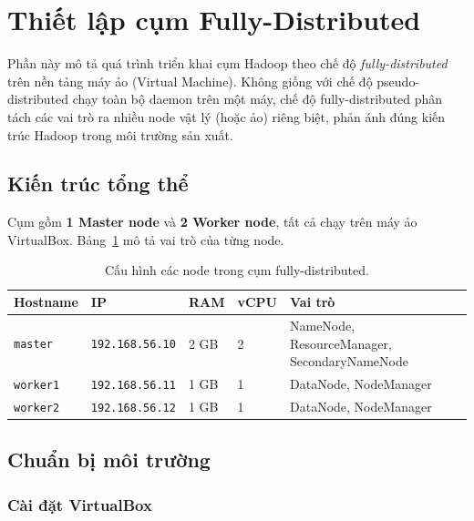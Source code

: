\section{Thiết lập cụm Fully-Distributed}
\label{sec:fully-distributed}


Phần này mô tả quá trình triển khai cụm Hadoop theo chế độ \textit{fully-distributed} trên nền tảng máy ảo (Virtual Machine). Không giống với chế độ pseudo-distributed chạy toàn bộ daemon trên một máy, chế độ fully-distributed phân tách các vai trò ra nhiều node vật lý (hoặc ảo) riêng biệt, phản ánh đúng kiến trúc Hadoop trong môi trường sản xuất.

\subsection{Kiến trúc tổng thể}

Cụm gồm \textbf{1 Master node} và \textbf{2 Worker node}, tất cả chạy trên máy ảo VirtualBox. Bảng~\ref{tab:cluster-nodes} mô tả vai trò của từng node.

\begin{table}[H]
\centering
\caption{Cấu hình các node trong cụm fully-distributed.}
\label{tab:cluster-nodes}
\begin{tabularx}{\textwidth}{llllX}
\toprule
\textbf{Hostname} & \textbf{IP} & \textbf{RAM} & \textbf{vCPU} & \textbf{Vai trò} \\
\midrule
\texttt{master}  & \texttt{192.168.56.10} & 2 GB & 2 & NameNode, ResourceManager, SecondaryNameNode \\
\texttt{worker1} & \texttt{192.168.56.11} & 1 GB & 1 & DataNode, NodeManager \\
\texttt{worker2} & \texttt{192.168.56.12} & 1 GB & 1 & DataNode, NodeManager \\
\bottomrule
\end{tabularx}
\end{table}


\subsection{Chuẩn bị môi trường}

\subsubsection{Cài đặt VirtualBox}

